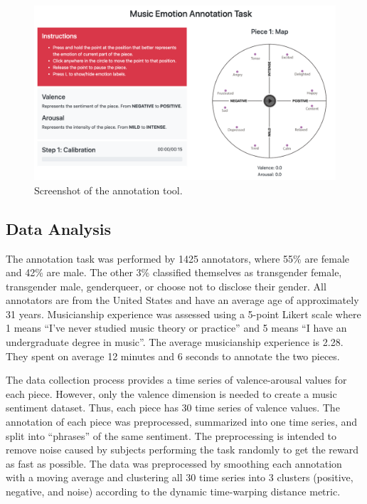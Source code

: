 \begin{figure}[!h]
 \centering
 \includegraphics[width=\columnwidth]{imgs/ismir19/annotation_tool.png}
 \caption{Screenshot of the annotation tool.}
 \label{fig:annotation_main}
\end{figure}

\subsection{Data Analysis}
\label{sec:data_analysys}

The annotation task was performed by 1425 annotators, where 55\% are female and 42\% are male. The other 3\% classified themselves as transgender female, transgender male, genderqueer, or choose not to disclose their gender. All annotators are from the United States and have an average age of approximately 31 years. Musicianship experience was assessed using a 5-point Likert scale where 1 means ``I've never studied music theory or practice'' and 5 means ``I have an undergraduate degree in music''. The average musicianship experience is 2.28. They spent on average 12 minutes and 6 seconds to annotate the two pieces.

The data collection process provides a time series of valence-arousal values for each piece. However, only the valence dimension is needed to create a music sentiment dataset. Thus, each piece has 30 time series of valence values. The annotation of each piece was preprocessed, summarized into one time series, and split into ``phrases'' of the same sentiment. The preprocessing is intended to remove noise caused by subjects performing the task randomly to get the reward as fast as possible. The data was preprocessed by smoothing each annotation with a moving average and clustering all 30 time series into 3 clusters (positive, negative, and noise) according to the dynamic time-warping distance metric.

